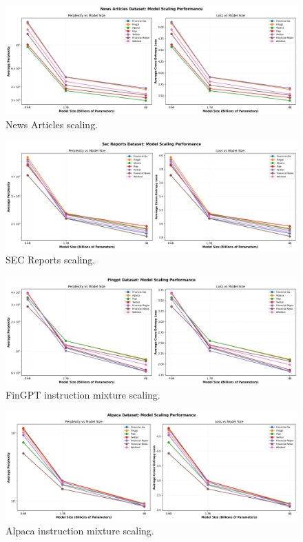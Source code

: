 \begin{figure}[H]
  \centering
  \includegraphics[width=\textwidth]{../thesis/figures/scaling_news_articles.png}
  \caption{News Articles scaling.}\label{fig:scaling_news_articles}
\end{figure}

\begin{figure}[H]
  \centering
  \includegraphics[width=\textwidth]{../thesis/figures/scaling_sec_reports.png}
  \caption{SEC Reports scaling.}\label{fig:scaling_sec_reports}
\end{figure}

\begin{figure}[H]
  \centering
  \includegraphics[width=\textwidth]{../thesis/figures/scaling_fingpt.png}
  \caption{FinGPT instruction mixture scaling.}\label{fig:scaling_fingpt}
\end{figure}

\begin{figure}[H]
  \centering
  \includegraphics[width=\textwidth]{../thesis/figures/scaling_alpaca.png}
  \caption{Alpaca instruction mixture scaling.}\label{fig:scaling_alpaca}
\end{figure}

